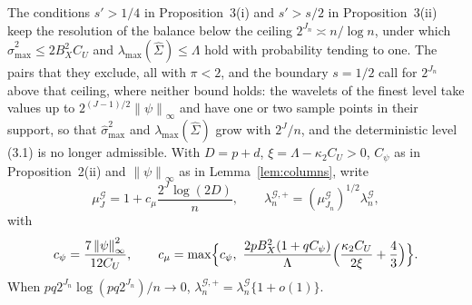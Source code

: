 \documentclass[10pt]{book}
\theoremstyle{definition}
\newcommand{\norm}[1]{\left\lVert #1 \right\rVert}
\newcommand{\Gramhat}{\widehat{\Sigma}}
\newcommand{\seff}{s'}
\newcommand{\smax}{\widehat{\sigma}_{\max}}
\newcommand{\lmaxx}{\lambda_{\max}}
\newcommand{\Gcal}{\mathcal{G}}
\newcommand{\lamG}{\lambda^{\mathcal{G}}_{n}}
\newcommand{\lamGp}{\lambda^{\mathcal{G},+}_{n}}   %
\begin{document}
{The conditions $\seff > 1/4$ in Proposition~3(i) and $\seff > s/2$ in
Proposition~3(ii) keep the resolution of the balance below the ceiling
$2^{J_n} \asymp n/\log n$, under which $\smax^{2} \le 2B_X^{2}C_U$ and
$\lmaxx(\Gramhat) \le \Lambda$ hold with probability tending to one. The pairs
that they exclude, all with $\pi < 2$, and the boundary $s = 1/2$ call for
$2^{J_n}$ above that ceiling, where neither bound holds: the wavelets of the
finest level take values up to $2^{(J-1)/2}\norm{\psi}_{\infty}$ and have one
or two sample points in their support, so that $\smax^{2}$ and
$\lmaxx(\Gramhat)$ grow with $2^{J}/n$, and the deterministic level (3.1) is
no longer admissible. With $D = p + d$, $\xi = \Lambda - \kappa_2C_U > 0$,
$C_\psi$ as in Proposition~2(ii) and $\norm{\psi}_{\infty}$ as in
Lemma~\ref{lem:columns}, write
\begin{equation}
  \label{eq:mu-blocks}
  \mu^{\Gcal}_{J} = 1 + c_{\mu}\frac{2^{J}\log(2D)}{n},
  \qquad
  \lamGp = (\mu^{\Gcal}_{J_n})^{1/2}\lamG,
\end{equation}
with
\[
  c_{\psi} = \frac{7\norm{\psi}_{\infty}^{2}}{12C_U},
  \qquad
  c_{\mu} = \max\Bigl\{c_{\psi},\
  \frac{2pB_X^{2}(1+qC_\psi)}{\Lambda}
  \Bigl(\frac{\kappa_2C_U}{2\xi} + \frac43\Bigr)\Bigr\}.
\]
When $pq2^{J_n}\log(pq2^{J_n})/n \to 0$, $\lamGp = \lamG\{1 + o(1)\}$.

}
\end{document}

